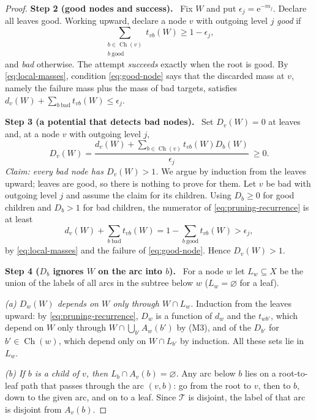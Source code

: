 \documentclass[11pt]{article}
\numberwithin{equation}{section}
\newcommand{\TT}{\mathcal T}
\newcommand{\ch}{\operatorname{Ch}}
\newcommand{\ee}{\mathrm e}
\newcommand{\step}[2]{\par\medskip\noindent\textbf{Step #1 (#2).}\ }
\begin{document}
\begin{proof}
\step{2}{good nodes and success}
Fix $W$ and put $\epsilon_j=\ee^{-m_j}$. Declare all leaves good.
Working upward, declare a node $v$ with outgoing level $j$ \emph{good}
if
\begin{equation}\label{eq:good-node}
 \sum_{\substack{b\in\ch(v)\\b\ \mathrm{good}}}t_{vb}(W)
 \ge1-\epsilon_j,
\end{equation}
and \emph{bad} otherwise. The attempt \emph{succeeds} exactly when the
root is good. By \eqref{eq:local-masses}, condition \eqref{eq:good-node}
says that the discarded mass at $v$, namely the failure mass plus the
mass of bad targets, satisfies
$d_v(W)+\sum_{b\ \mathrm{bad}}t_{vb}(W)\le\epsilon_j$.

\step{3}{a potential that detects bad nodes}
Set $D_v(W)=0$ at leaves and, at a node $v$ with outgoing level $j$,
\begin{equation}\label{eq:pruning-recurrence}
 D_v(W)=\frac{d_v(W)+\sum_{b\in\ch(v)}t_{vb}(W)D_b(W)}{\epsilon_j}\ \ge0.
\end{equation}
\emph{Claim: every bad node has $D_v(W)>1$.} We argue by induction from
the leaves upward; leaves are good, so there is nothing to prove for
them. Let $v$ be bad with outgoing level $j$ and assume the claim for
its children. Using $D_b\ge0$ for good children and $D_b>1$ for bad
children, the numerator of \eqref{eq:pruning-recurrence} is at least
\[
 d_v(W)+\sum_{b\ \mathrm{bad}}t_{vb}(W)
 =1-\sum_{b\ \mathrm{good}}t_{vb}(W)>\epsilon_j,
\]
by \eqref{eq:local-masses} and the failure of \eqref{eq:good-node}.
Hence $D_v(W)>1$.

\step{4}{$D_b$ ignores $W$ on the arc into $b$}
For a node $w$ let $L_w\subseteq X$ be the union of the labels of all
arcs in the subtree below $w$ ($L_w=\varnothing$ for a leaf).

\emph{(a) $D_w(W)$ depends on $W$ only through $W\cap L_w$.} Induction
from the leaves upward: by \eqref{eq:pruning-recurrence}, $D_w$ is a
function of $d_w$ and the $t_{wb'}$, which depend on $W$ only through
$W\cap\bigcup_{b'}A_w(b')$ by (M3), and of the $D_{b'}$ for
$b'\in\ch(w)$, which depend only on $W\cap L_{b'}$ by induction. All
these sets lie in $L_w$.

\emph{(b) If $b$ is a child of $v$, then
$L_b\cap A_v(b)=\varnothing$.} Any arc below $b$ lies on a root-to-leaf
path that passes through the arc $(v,b)$: go from the root to $v$, then
to $b$, down to the given arc, and on to a leaf. Since $\TT$ is
disjoint, the label of that arc is disjoint from $A_v(b)$.


\end{proof}
\end{document}
